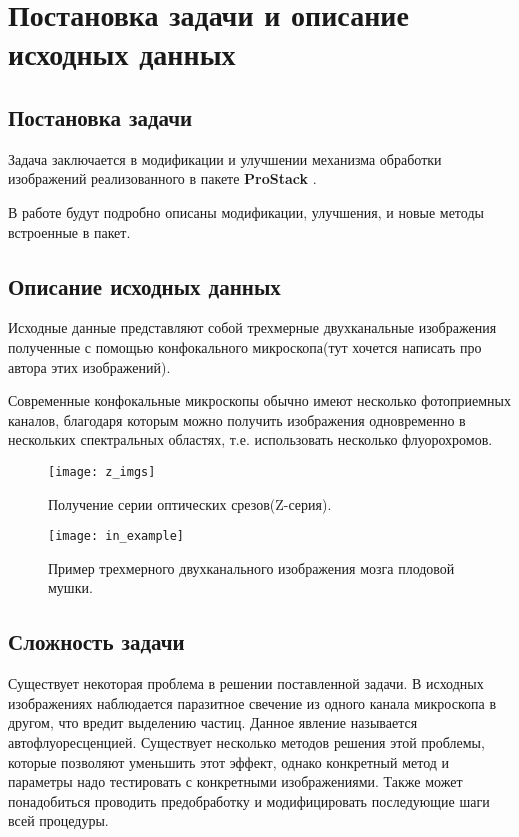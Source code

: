 \chapter{Постановка задачи и описание исходных данных} \label{ch1}



\section{Постановка задачи} \label{ch1:sec1}
Задача заключается в модификации и улучшении механизма обработки изображений реализованного в пакете \textbf{ProStack} \cite{prostack}.

В работе будут подробно описаны модификации, улучшения, и новые методы встроенные в пакет. 


\section{Описание исходных данных} \label{ch1:sec2} 


 Исходные данные представляют собой трехмерные двухканальные изображения полученные с помощью конфокального микроскопа(тут хочется написать про автора этих изображений).
 
Современные конфокальные микроскопы обычно имеют несколько
фотоприемных каналов, благодаря которым можно получить изображения
одновременно в нескольких спектральных областях, т.е. использовать
несколько флуорохромов. 
\begin{figure}[H]
	\centering
	\texttt{[image: z\_imgs]}
	\caption{Получение серии оптических срезов(Z-серия).}
	\label{z_imgs}
\end{figure}

\begin{figure}[H]
	\centering
	\texttt{[image: in\_example]}
	\caption{Пример трехмерного двухканального изображения мозга плодовой мушки.}
	\label{in_example}
\end{figure}



\section{Сложность задачи} \label{ch1:sec3}
Существует некоторая проблема в решении поставленной задачи. В исходных изображениях наблюдается паразитное свечение из одного канала микроскопа в другом, что вредит выделению частиц. Данное явление называется автофлуоресценцией. Существует несколько методов решения этой проблемы, которые позволяют уменьшить этот эффект, однако конкретный метод и параметры надо тестировать с конкретными изображениями. Также может понадобиться проводить предобработку и модифицировать последующие шаги всей процедуры. 

